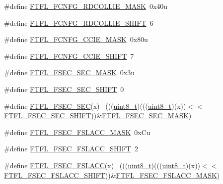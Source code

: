 \begin{DoxyCompactItemize}
\#define \hyperlink{group___f_t_f_l___register___masks_ga510a9cceeec010a1b628e72a66faf142}{F\+T\+F\+L\+\_\+\+F\+C\+N\+F\+G\+\_\+\+R\+D\+C\+O\+L\+L\+I\+E\+\_\+\+M\+A\+SK}~0x40u
\item 
\#define \hyperlink{group___f_t_f_l___register___masks_gab1632db5bed20c53367fabd03f3dbf30}{F\+T\+F\+L\+\_\+\+F\+C\+N\+F\+G\+\_\+\+R\+D\+C\+O\+L\+L\+I\+E\+\_\+\+S\+H\+I\+FT}~6
\item 
\#define \hyperlink{group___f_t_f_l___register___masks_ga83295213a4020ff039f039f13e7353c5}{F\+T\+F\+L\+\_\+\+F\+C\+N\+F\+G\+\_\+\+C\+C\+I\+E\+\_\+\+M\+A\+SK}~0x80u
\item 
\#define \hyperlink{group___f_t_f_l___register___masks_ga16393b0217b60ede6ab76a77af77ecff}{F\+T\+F\+L\+\_\+\+F\+C\+N\+F\+G\+\_\+\+C\+C\+I\+E\+\_\+\+S\+H\+I\+FT}~7
\item 
\#define \hyperlink{group___f_t_f_l___register___masks_ga0f4601a13f1fb12d6f8485c7f4365498}{F\+T\+F\+L\+\_\+\+F\+S\+E\+C\+\_\+\+S\+E\+C\+\_\+\+M\+A\+SK}~0x3u
\item 
\#define \hyperlink{group___f_t_f_l___register___masks_ga654233732a4fa90f3803390929c69c43}{F\+T\+F\+L\+\_\+\+F\+S\+E\+C\+\_\+\+S\+E\+C\+\_\+\+S\+H\+I\+FT}~0
\item 
\#define \hyperlink{group___f_t_f_l___register___masks_ga21d8e1c3f34080570d603748e3707f91}{F\+T\+F\+L\+\_\+\+F\+S\+E\+C\+\_\+\+S\+EC}(x)                                              ~(((\hyperlink{_p_e___types_8h_aba7bc1797add20fe3efdf37ced1182c5}{uint8\+\_\+t})(((\hyperlink{_p_e___types_8h_aba7bc1797add20fe3efdf37ced1182c5}{uint8\+\_\+t})(x))$<$$<$\hyperlink{group___f_t_f_l___register___masks_ga654233732a4fa90f3803390929c69c43}{F\+T\+F\+L\+\_\+\+F\+S\+E\+C\+\_\+\+S\+E\+C\+\_\+\+S\+H\+I\+FT}))\&\hyperlink{group___f_t_f_l___register___masks_ga0f4601a13f1fb12d6f8485c7f4365498}{F\+T\+F\+L\+\_\+\+F\+S\+E\+C\+\_\+\+S\+E\+C\+\_\+\+M\+A\+SK})
\item 
\#define \hyperlink{group___f_t_f_l___register___masks_gaf2d2429c178b2b7cd61dc4682071bb3b}{F\+T\+F\+L\+\_\+\+F\+S\+E\+C\+\_\+\+F\+S\+L\+A\+C\+C\+\_\+\+M\+A\+SK}~0x\+Cu
\item 
\#define \hyperlink{group___f_t_f_l___register___masks_gab4d62d1117f55fd4febfff6784a7195f}{F\+T\+F\+L\+\_\+\+F\+S\+E\+C\+\_\+\+F\+S\+L\+A\+C\+C\+\_\+\+S\+H\+I\+FT}~2
\item 
\#define \hyperlink{group___f_t_f_l___register___masks_ga2972b4924daf741302ab52f6ffb88fd6}{F\+T\+F\+L\+\_\+\+F\+S\+E\+C\+\_\+\+F\+S\+L\+A\+CC}(x)                                        ~(((\hyperlink{_p_e___types_8h_aba7bc1797add20fe3efdf37ced1182c5}{uint8\+\_\+t})(((\hyperlink{_p_e___types_8h_aba7bc1797add20fe3efdf37ced1182c5}{uint8\+\_\+t})(x))$<$$<$\hyperlink{group___f_t_f_l___register___masks_gab4d62d1117f55fd4febfff6784a7195f}{F\+T\+F\+L\+\_\+\+F\+S\+E\+C\+\_\+\+F\+S\+L\+A\+C\+C\+\_\+\+S\+H\+I\+FT}))\&\hyperlink{group___f_t_f_l___register___masks_gaf2d2429c178b2b7cd61dc4682071bb3b}{F\+T\+F\+L\+\_\+\+F\+S\+E\+C\+\_\+\+F\+S\+L\+A\+C\+C\+\_\+\+M\+A\+SK})

\end{DoxyCompactItemize}
